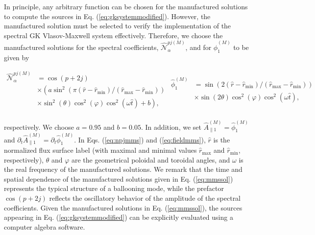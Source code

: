 \documentclass[preprint,12pt]{elsarticle}
\begin{document}
In principle, any arbitrary function can be chosen for the manufactured solutions to compute the sources in Eq. (\ref{eq:gksystemmodified}). However, the manufactured solution must be selected to verify the implementation of the spectral GK Vlasov-Maxwell system effectively. Therefore, we choose the manufactured solutions for the spectral coefficients, $\hat{\mathcal{N}}_\alpha^{pj (M)}$, and for $\hat{\phi}_1^{(M)}$ to be given by

\begin{subequations} \label{eq:mmssol}
\begin{align} \label{eq:npjmms}
\hat{\mathcal{N}}_\alpha^{pj (M)} & = \cos(p + 2j) \nonumber \\
& \times \left(a \sin^2\left( \pi (\hat r - \hat r_{\text{min}}) / (\hat r_{\text{max}}- \hat r_{\text{min}})\right) \right. \nonumber \\
& \left. \times \sin^2 \left( \theta \right) \cos^2 \left( \varphi \right) \cos^2\left( \omega \hat t \right)+ b \right),
\end{align}
\begin{align} \label{eq:fieldmms}
\hat \phi^{(M)}_1  & =  \sin\left( 2 (\hat r - \hat r_{\text{min}}) / (\hat r_{\text{max}}- \hat r_{\text{min}})\right) \nonumber \\
& \times \sin \left( 2 \theta \right) \cos^2 \left( \varphi \right) \cos^2\left( \omega \hat t \right),
\end{align}
\end{subequations}
\\
respectively. We choose $a = 0.95$ and $b = 0.05$. In addition, we set $\hat{A}_{\parallel 1}^{(M)} = \hat \phi^{(M)}_1 $ and $\partial_t \hat{A}_{\parallel 1}^{(M)} = \partial_t \hat \phi^{(M)}_1 $. In Eqs. (\ref{eq:npjmms}) and (\ref{eq:fieldmms}), $\hat{r}$ is the normalized flux surface label (with maximal and minimal values $\hat{r}_{\text{max}}$ and $\hat{r}_{\text{min}}$, respectively), $\theta$ and $\varphi$ are the geometrical poloidal and toroidal angles, and $\omega$ is the real frequency of the manufactured solutions. We remark that the time and spatial dependence of the manufactured solutions given in Eq. (\ref{eq:mmssol}) represents the typical structure of a ballooning mode, while the prefactor $\cos(p + 2j)$ reflects the oscillatory behavior of the amplitude of the spectral coefficients. Given the manufactured solutions in Eq. (\ref{eq:mmssol}), the sources appearing in Eq. (\ref{eq:gksystemmodified}) can be explicitly evaluated using a computer algebra software.
\end{document}
